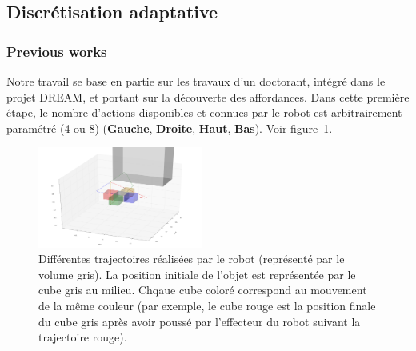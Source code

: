 \documentclass{llncs}
\begin{document}







\subsection{Discrétisation adaptative}



\subsubsection{Previous works}

Notre travail se base en partie sur les travaux d'un doctorant, intégré dans le projet DREAM, et portant sur la découverte des affordances. Dans cette première étape, le nombre d'actions disponibles et connues par le robot est arbitrairement paramétré (4 ou 8) (\textbf{Gauche}, \textbf{Droite}, \textbf{Haut}, \textbf{Bas}). Voir figure~\ref{fig:trajectories}.


\begin{figure}
  \begin{center}
    \includegraphics[width=0.48\textwidth]{figures/trajectories}
  \end{center}
  \caption{Différentes trajectoires réalisées par le robot (représenté par le volume gris). La position initiale de l'objet est représentée par le cube gris au milieu. Chqaue cube coloré correspond au mouvement de la même couleur (par exemple, le cube rouge est la position finale du cube gris après avoir poussé par l'effecteur du robot suivant la trajectoire rouge).}
  \label{fig:trajectories}
\end{figure}
\end{document}
